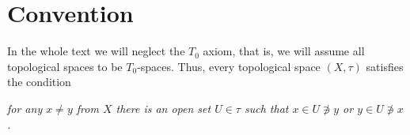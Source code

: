 \section*{Convention}

In the whole text we will neglect the $T_0$ axiom, that is, we will assume all
topological spaces to be $T_0$-spaces.
Thus, every topological space $(X, \tau)$ satisfies the condition
\begin{center} \it
  for any $x \ne y$ from $X$ there is an open set $U \in \tau$ such that $x \in
  U \not\owns y$ or $y \in U \not\owns x$.
\end{center}
